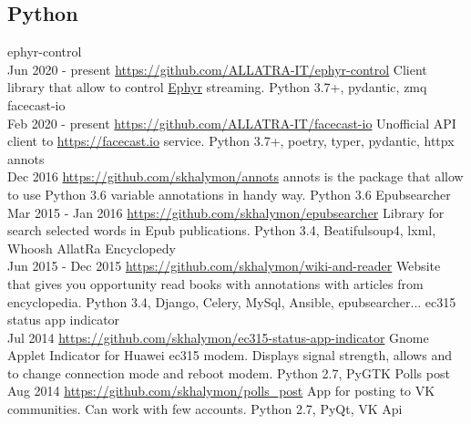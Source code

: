 \documentclass[11pt,a4paper]{moderncv}
\begin{document}
	\subsection{Python}
	\cvline
	{ephyr-control\\ Jun 2020 - present}
	{\url{https://github.com/ALLATRA-IT/ephyr-control}\newline{}
		Client library that allow to control \href{https://github.com/ALLATRA-IT/ephyr}{Ephyr} streaming. \newline{}
		Python 3.7+, pydantic, zmq}
	\cvline
	{facecast-io\\ Feb 2020 - present}
	{\url{https://github.com/ALLATRA-IT/facecast-io}\newline{}
		Unofficial API client to \url{https://facecast.io} service. \newline{}
		Python 3.7+, poetry, typer, pydantic, httpx}
	\cvline
	{annots\\ Dec 2016}
	{\url{https://github.com/skhalymon/annots}\newline{}
		annots is the package that allow to use Python 3.6 variable annotations in handy way.\newline{}
		Python 3.6}
	\cvline
	{Epubsearcher\\ Mar 2015 - Jan 2016}
	{\url{https://github.com/skhalymon/epubsearcher}\newline{}
		Library for search selected words in Epub publications.\newline{}
		Python 3.4, Beatifulsoup4, lxml, Whoosh}
	\cvline
	{AllatRa Encyclopedy\\ Jun 2015 - Dec 2015}
	{\url{https://github.com/skhalymon/wiki-and-reader}\newline{}
	    Website that gives you opportunity read books with annotations
		with articles from encyclopedia. \newline{}
		Python 3.4, Django, Celery, MySql, Ansible, epubsearcher...}
    \cvline
	{ec315 status app indicator\\ Jul 2014}
	{\url{https://github.com/skhalymon/ec315-status-app-indicator}\newline{}
		Gnome Applet Indicator for Huawei ec315 modem. Displays signal strength, allows and to change connection mode and reboot modem.\newline{}
		Python 2.7, PyGTK }
	\cvline
	{Polls post\\ Aug 2014}
	{\url{https://github.com/skhalymon/polls_post}\newline{}
		App for posting to VK communities. Can work with few accounts.\newline{}
		Python 2.7, PyQt, VK Api}
\end{document}
